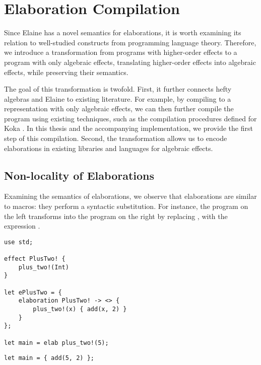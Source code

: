\chapter{Elaboration Compilation}\label{chap:elabcomp}

Since Elaine has a novel semantics for elaborations, it is worth examining its relation to well-studied constructs from programming language theory. Therefore, we introduce a transformation from programs with higher-order effects to a program with only algebraic effects, translating higher-order effects into algebraic effects, while preserving their semantics.

The goal of this transformation is twofold. First, it further connects hefty algebras and Elaine to existing literature. For example, by compiling to a representation with only algebraic effects, we can then further compile the program using existing techniques, such as the compilation procedures defined for Koka \autocite{leijen_type_2017}. In this thesis and the accompanying implementation, we provide the first step of this compilation. Second, the transformation allows us to encode elaborations in existing libraries and languages for algebraic effects.

\section{Non-locality of Elaborations}


Examining the semantics of elaborations, we observe that elaborations are similar to macros: they perform a syntactic substitution. For instance, the program on the left transforms into the program on the right by replacing , with the expression .

\begin{minipage}[b]{0.5\textwidth}
\begin{lstlisting}[language=elaine,style=fancy]
use std;

effect PlusTwo! {
    plus_two!(Int)
}

let ePlusTwo = {
    elaboration PlusTwo! -> <> {
        plus_two!(x) { add(x, 2) }
    }
};

let main = elab plus_two!(5);
\end{lstlisting}
\end{minipage}
\begin{minipage}[b]{0.5\textwidth}
\begin{lstlisting}[language=elaine,style=fancy]
let main = { add(5, 2) };
\end{lstlisting}
\end{minipage}

